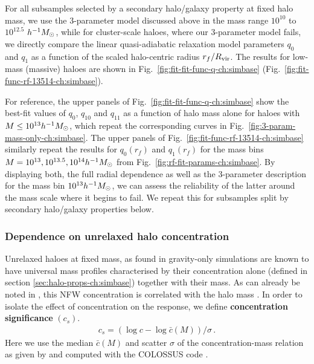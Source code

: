 For all subsamples selected by a secondary halo/galaxy property at fixed halo mass, we use the 3-parameter model discussed above in the mass range $10^{10}$ to $10^{12.5}$ $h^{-1}M_{\odot}$, 
while for cluster-scale haloes, where our 3-parameter model fails, we directly compare the linear quasi-adiabatic relaxation model parameters $q_0$ and $q_1$ as a function of the scaled halo-centric radius $r_f/R_{\rm vir}$. The results for low-mass (massive) haloes are shown in Fig.~\ref{fig:fit-fit-func-q-ch:simbase} (Fig.~\ref{fig:fit-func-rf-13514-ch:simbase}).


For reference, the upper panels of Fig.~\ref{fig:fit-fit-func-q-ch:simbase} show the best-fit values of $q_0$, $q_{10}$ and $q_{11}$ as a function of halo mass alone for haloes with $M\leq10^{13}h^{-1}M_{\odot}$,
which repeat the corresponding curves in Fig.~\ref{fig:3-param-mass-only-ch:simbase}. The upper panels of Fig.~\ref{fig:fit-func-rf-13514-ch:simbase} similarly repeat the results for $q_0(r_f)$ and $q_1(r_f)$ for the mass bins $M=10^{13},10^{13.5},10^{14}h^{-1}M_{\odot}$ from Fig.~\ref{fig:rf-fit-params-ch:simbase}. By displaying both, the full radial dependence as well as the 3-parameter description for the mass bin $10^{13}h^{-1}M_{\odot}$, we can assess the reliability of the latter around the mass scale where it begins to fail. We repeat this for subsamples split by secondary halo/galaxy properties below.



\subsubsection{Dependence on unrelaxed halo concentration}
Unrelaxed haloes at fixed mass, as found in gravity-only simulations are known to have universal mass profiles characterised by their concentration alone (defined in section \ref{sec:halo-props-ch:simbase}) together with their mass.
As can already be noted in , this NFW concentration is correlated with the halo mass \citep[see e.g. ][]{2006ApJ...652...71W,2007MNRAS.378...55M,2015ApJ...799..108D,2017MNRAS.468.2984P}.
In order to isolate the effect of concentration on the response, we define \textbf{concentration significance} $(c_s)$.
\begin{align}
c_s = \left(\log c- \log \bar{c}(M)\right)/\sigma\,. \nonumber
\end{align}
Here we use the median $\bar{c}(M)$ and scatter $\sigma$ of the concentration-mass relation as given by \citet{2019ApJ...871..168D} and computed with the COLOSSUS code \citep[][]{2018ApJS..239...35D}.

